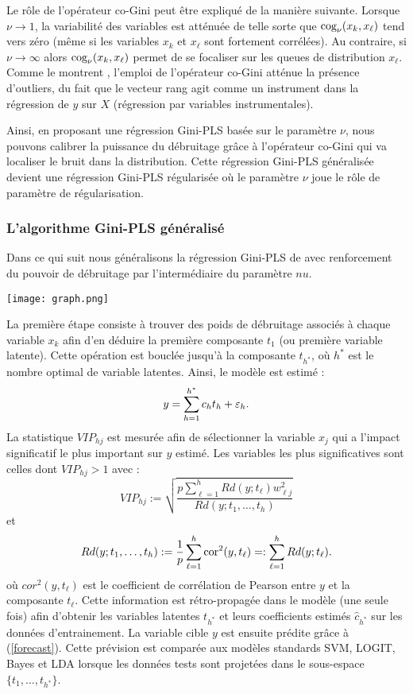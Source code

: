 Le rôle de l'opérateur co-Gini peut être expliqué de la manière suivante. Lorsque $\nu \rightarrow 1$, la variabilité des variables est atténuée de telle sorte que $\text{cog}_\nu(x_k,x_\ell)$ tend vers zéro (même si les variables $x_k$ et $x_\ell$ sont fortement corrélées). Au contraire, si $\nu \rightarrow \infty $ alors $\text{cog}_\nu(x_k,x_\ell)$ permet de se focaliser sur les queues de distribution $x_\ell$. Comme le montrent \citet{olkin1992gini}, l'emploi de l'opérateur co-Gini atténue la présence d'outliers, du fait que le vecteur rang agit comme un instrument dans la régression de $y$ sur $X$ (régression par variables instrumentales).    

Ainsi, en proposant une régression Gini-PLS basée sur le paramètre $\nu$, nous pouvons calibrer la puissance du débruitage  grâce à l'opérateur co-Gini qui va localiser le bruit dans la distribution. Cette régression Gini-PLS généralisée devient une régression Gini-PLS régularisée où le paramètre $\nu$ joue le rôle de paramètre de régularisation. 


\subsubsection{L'algorithme Gini-PLS généralisé} 

Dans ce qui suit nous généralisons la régression Gini-PLS de \citet{mussard2018ginipls} avec renforcement du pouvoir de débruitage par l'intermédiaire du paramètre $nu$.


\begin{center}
	\texttt{[image: graph.png]}
\end{center}


La première étape consiste à trouver des poids de débruitage associés à chaque variable $x_k$ afin d'en déduire la première composante $t_1$ (ou première variable latente). Cette opération est bouclée jusqu'à la composante $t_{h^*}$, où $h^*$ est le nombre optimal de variable latentes. Ainsi, le modèle est estimé :
\begin{equation}\label{forecast}
y=\sum_{h=1}^{h^*} c_ht_h +\varepsilon_h.
\end{equation}   
La statistique $VIP_{hj}$ est mesurée afin de sélectionner la variable $x_j$ qui a l'impact significatif le plus important sur $y$ estimé. Les variables les plus significatives sont celles dont $VIP_{hj}>1$ avec :
\[
VIP_{hj} := \sqrt{\frac{p\sum_{\ell=1}^{h}Rd(y;t_\ell)w_{\ell j}^2}{Rd(y;t_1,\ldots,t_h)}} 
\] 
et 
\[
Rd(y; t_1,\ldots,t_h) := \frac{1}{p}\sum_{\ell=1}^{h}\text{cor}^2(y,t_\ell) =: \sum_{\ell=1}^{h}Rd(y;t_\ell).
\]
où $cor^2(y,t_\ell)$ est le coefficient de corrélation de Pearson entre $y$ et la composante $t_\ell$. Cette information est rétro-propagée dans le modèle (une seule fois) afin d'obtenir les variables latentes $t_{h^*}$ et leurs coefficients estimés $\hat{c}_{h^*}$ sur les données d'entrainement. La variable cible $y$ est ensuite prédite grâce à (\ref{forecast}). Cette prévision est comparée aux modèles standards SVM, LOGIT, Bayes et LDA lorsque les données tests sont projetées dans le sous-espace $\{t_1,\ldots,t_{h^*}\}$.\\


